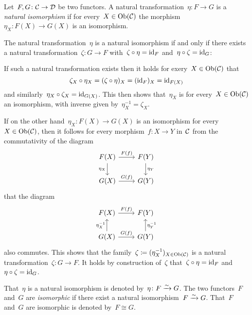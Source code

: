 \begin{remarkdefinition}
  Let~$F, G \colon \mathcal{C} \to \mathcal{D}$ be two functors.
  A natural transformation~$\eta \colon F \to G$ is a \emph{natural isomorphism} if for every~$X \in \operatorname{Ob}(\mathcal{C})$ the morphism~$\eta_X \colon F(X) \to G(X)$ is an isomorphism.
  
  The natural transformation~$\eta$ is a natural isomorphism if and only if there exists a natural transformation~$\zeta \colon G \to F$ with~$\zeta \circ \eta = \mathrm{id}_F$ and~$\eta \circ \zeta = \mathrm{id}_G$:
  
  If such a natural transformation exists then it holds for exery~$X \in \operatorname{Ob}(\mathcal{C})$ that
  \[
      \zeta_X \circ \eta_X
    = (\zeta \circ \eta)_X
    = (\mathrm{id}_F)_X
    = \mathrm{id}_{F(X)}
  \]
  and similarly~$\eta_X \circ \zeta_X = \mathrm{id}_{G(X)}$.
  This then shows that~$\eta_X$ is for every~$X \in \operatorname{Ob}(\mathcal{C})$ an isomorphism, with inverse given by~$\eta_X^{-1} = \zeta_X$.
  
  If on the other hand~$\eta_X \colon F(X) \to G(X)$ is an isomorphism for every~$X \in \operatorname{Ob}(\mathcal{C})$, then it follows for every morphism~$f \colon X \to Y$ in~$\mathcal{C}$ from the commutativity of the diagram
  \[
    \begin{tikzcd}
        F(X)
        \arrow{r}[above]{F(f)}
        \arrow{d}[left]{\eta_X}
      & F(Y)
        \arrow{d}[right]{\eta_Y}
      \\
        G(X)
        \arrow{r}[above]{G(f)}
      & G(Y)
    \end{tikzcd}
  \]
  that the diagram
  \[
    \begin{tikzcd}
        F(X)
        \arrow{r}[above]{F(f)}
      & F(Y)
      \\
        G(X)
        \arrow{u}[left]{\eta_X^{-1}}
        \arrow{r}[above]{G(f)}
      & G(Y)
        \arrow{u}[right]{\eta_Y^{-1}}
    \end{tikzcd}
  \]
  also commutes.
  This shows that the family~$\zeta \coloneqq (\eta_X^{-1})_{X \in \operatorname{Ob}(\mathcal{C})}$ is a natural transformation~$\zeta \colon G \to F$.
  It holds by construction of~$\zeta$ that~$\zeta \circ \eta = \mathrm{id}_F$ and~$\eta \circ \zeta = \mathrm{id}_G$.
  
  That~$\eta$ is a natural isomorphism is denoted by~$\eta \colon F \xrightarrow{\sim} G$.
  The two functors~$F$ and~$G$ are \emph{isomorphic} if there exist a natural isomorphism~$F \xrightarrow{\sim} G$.
  That~$F$ and~$G$ are isomorphic is denoted by~$F \cong G$.
\end{remarkdefinition}


